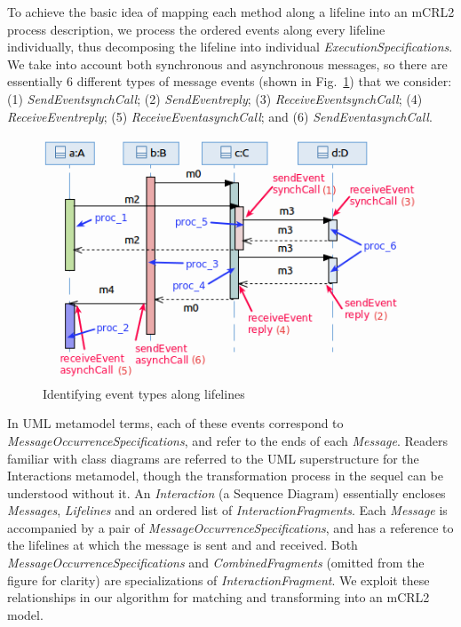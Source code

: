 \documentclass[letter]{llncs}
\newcommand{\figshrink}{\vspace{-.6cm}}
\newcommand{\figshrinkend}{}
\begin{document}
To achieve the basic idea of mapping each method along a lifeline into an mCRL2 process description, we process the ordered events along every
lifeline individually, thus decomposing the lifeline into individual \emph{ExecutionSpecifications}. 
We take into account both synchronous and asynchronous messages, 
so there are essentially 6 different types of message events (shown in Fig.~\ref{fig:exampleProcesses}) that we consider: 
(1) \emph{SendEvent}\textunderscore\emph{synchCall}; (2) \emph{SendEvent}\textunderscore\emph{reply}; (3) \emph{ReceiveEvent}\textunderscore\emph{synchCall}; 
(4) \emph{ReceiveEvent}\textunderscore\emph{reply};
(5) \emph{ReceiveEvent}\textunderscore\emph{asynchCall}; and (6) \emph{SendEvent}\textunderscore\emph{asynchCall}.
\begin{figure}[!b]
\centering
\includegraphics[width=0.65\linewidth,keepaspectratio=true]{./Figure4_final.png}
\caption{Identifying event types along lifelines}
\label{fig:exampleProcesses}
\end{figure}
In UML metamodel terms, each of these events correspond to \emph{MessageOccurrenceSpecifications}, and refer to the ends of each \emph{Message}.
Readers familiar with class diagrams are referred to the UML superstructure\cite{UML2.4}
for the Interactions metamodel,
though the transformation process in the sequel can be understood
without it.
An \emph{Interaction} (a Sequence Diagram)
essentially encloses \emph{Messages}, \emph{Lifelines} and an ordered list of \emph{InteractionFragments}.
Each \emph{Message} is accompanied by a pair of \emph{MessageOccurrenceSpecifications}, and has a reference to
the lifelines at which the message is sent and and received. 
Both \emph{MessageOccurrenceSpecifications} and \emph{CombinedFragments} (omitted from the figure for clarity) 
are specializations of \emph{InteractionFragment}.
We exploit these relationships in our algorithm for matching and transforming into an mCRL2 model.
\end{document}
